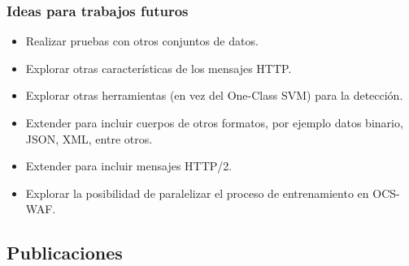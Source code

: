 \begin{frame}
    \frametitle{Ideas para trabajos futuros}

    \begin{itemize}[<+(1)->]
        \item
        Realizar pruebas con otros conjuntos de datos.

        \item
        Explorar otras características de los mensajes HTTP.

        \item
        Explorar otras herramientas (en vez del One-Class SVM) para la
        detección.

        \item
        Extender para incluir cuerpos de otros formatos, por ejemplo
        datos binario, JSON, XML, entre otros.

        \item
        Extender para incluir mensajes HTTP/2.

        \item
        Explorar la posibilidad de paralelizar el proceso de entrenamiento
        en OCS-WAF.
    \end{itemize}
\end{frame}



\subsection{Publicaciones}

